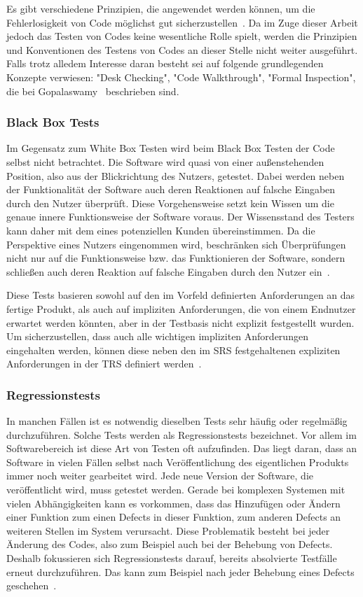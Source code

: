 Es gibt verschiedene Prinzipien, die angewendet werden können, um die Fehlerlosigkeit von Code möglichst gut sicherzustellen~\cite{Gopalaswamy.2009}. Da im Zuge dieser Arbeit jedoch das Testen von Codes keine wesentliche Rolle spielt, werden die Prinzipien und Konventionen des Testens von Codes an dieser Stelle nicht weiter ausgeführt. Falls trotz alledem Interesse daran besteht sei auf folgende grundlegenden Konzepte verwiesen: "Desk Checking", "Code Walkthrough", "Formal Inspection", die bei Gopalaswamy~\cite{Gopalaswamy.2009} beschrieben sind.


\subsubsection{Black Box Tests}
Im Gegensatz zum White Box Testen wird beim Black Box Testen der Code selbst nicht betrachtet. Die Software wird quasi von einer außenstehenden Position, also aus der Blickrichtung des Nutzers, getestet. 
Dabei werden neben der Funktionalität der Software auch deren Reaktionen auf falsche Eingaben durch den Nutzer überprüft.
Diese Vorgehensweise setzt kein Wissen um die genaue innere Funktionsweise der Software voraus. Der Wissensstand des Testers kann daher mit dem eines potenziellen Kunden übereinstimmen.
Da die Perspektive eines Nutzers eingenommen wird, beschränken sich Überprüfungen nicht nur auf die Funktionsweise bzw. das Funktionieren der Software, sondern schließen auch deren  Reaktion auf falsche Eingaben durch den Nutzer ein~\cite{Gopalaswamy.2009}.
\newline


Diese Tests basieren sowohl auf den im Vorfeld definierten Anforderungen an das fertige Produkt, als  auch auf impliziten Anforderungen, die  von einem Endnutzer erwartet werden könnten, aber in der Testbasis nicht explizit festgestellt wurden. Um sicherzustellen, dass auch alle wichtigen impliziten Anforderungen eingehalten werden, können diese neben den im \ac{SRS} festgehaltenen expliziten Anforderungen in der \ac{TRS} definiert werden~\cite{Gopalaswamy.2009}. 

\subsubsection{Regressionstests}
In manchen Fällen ist es notwendig dieselben Tests sehr häufig oder regelmäßig durchzuführen. Solche Tests werden als Regressionstests bezeichnet. Vor allem im Softwarebereich ist diese Art von Testen oft aufzufinden. Das liegt daran, dass an Software in vielen Fällen selbst nach Veröffentlichung des eigentlichen Produkts immer noch weiter gearbeitet wird. Jede neue Version der Software, die veröffentlicht wird, muss getestet werden. Gerade bei komplexen Systemen mit vielen Abhängigkeiten kann es vorkommen, dass das Hinzufügen oder Ändern einer Funktion zum einen Defects in dieser Funktion, zum anderen Defects an weiteren Stellen im System verursacht. Diese Problematik besteht bei jeder Änderung des Codes, also zum Beispiel auch bei der Behebung von Defects. Deshalb fokussieren sich Regressionstests darauf, bereits absolvierte Testfälle erneut durchzuführen. Das kann zum Beispiel nach jeder Behebung eines Defects geschehen~\cite{Gopalaswamy.2009}.


